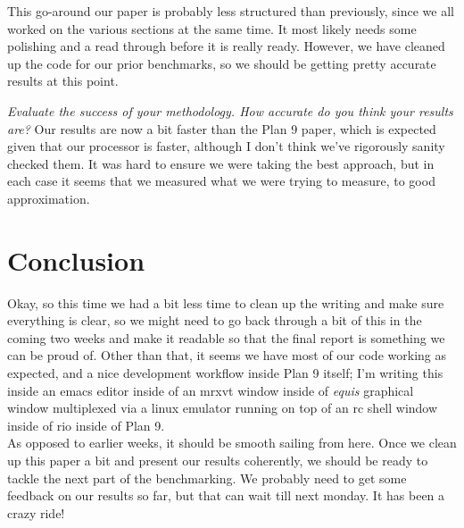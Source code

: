 \documentclass[letterpaper,twocolumn,10pt]{article}
\begin{document}
This go-around our paper is probably less structured than previously, since we all worked on the various sections at the same time. It most likely needs some polishing and a read through before it is really ready. However, we have cleaned up the code for our prior benchmarks, so we should be getting pretty accurate results at this point.

    
    \textit{Evaluate the success of your methodology. How accurate do you think your results are?}
    Our results are now a bit faster than the Plan 9 paper, which is expected given that our processor is faster, although I don't think we've rigorously sanity checked them. It was hard to ensure we were taking the best approach, but in each case it seems that we measured what we were trying to measure, to good approximation.

\section{Conclusion}

Okay, so this time we had a bit less time to clean up the writing and make sure everything is clear, so we might need to go back through a bit of this in the coming two weeks and make it readable so that the final report is something we can be proud of. Other than that, it seems we have most of our code working as expected, and a nice development workflow inside Plan 9 itself; I'm writing this inside an emacs editor inside of an mrxvt window inside of \textit{equis} graphical window multiplexed via a linux emulator running on top of an rc shell window inside of rio inside of Plan 9. \\

As opposed to earlier weeks, it should be smooth sailing from here. Once we clean up this paper a bit and present our results coherently, we should be ready to tackle the next part of the benchmarking. We probably need to get some feedback on our results so far, but that can wait till next monday. It has been a crazy ride!

{\normalsize 
}


\end{document}
